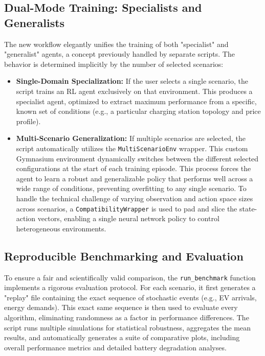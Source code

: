 \subsection{Dual-Mode Training: Specialists and Generalists}
The new workflow elegantly unifies the training of both "specialist" and "generalist" agents, a concept previously handled by separate scripts. The behavior is determined implicitly by the number of selected scenarios:
\begin{itemize}
    \item \textbf{Single-Domain Specialization:} If the user selects a single scenario, the script trains an RL agent exclusively on that environment. This produces a specialist agent, optimized to extract maximum performance from a specific, known set of conditions (e.g., a particular charging station topology and price profile).
    \item \textbf{Multi-Scenario Generalization:} If multiple scenarios are selected, the script automatically utilizes the \texttt{MultiScenarioEnv} wrapper. This custom Gymnasium environment dynamically switches between the different selected configurations at the start of each training episode. This process forces the agent to learn a robust and generalizable policy that performs well across a wide range of conditions, preventing overfitting to any single scenario. To handle the technical challenge of varying observation and action space sizes across scenarios, a \texttt{CompatibilityWrapper} is used to pad and slice the state-action vectors, enabling a single neural network policy to control heterogeneous environments.
\end{itemize}

\subsection{Reproducible Benchmarking and Evaluation}
To ensure a fair and scientifically valid comparison, the \texttt{run\_benchmark} function implements a rigorous evaluation protocol. For each scenario, it first generates a "replay" file containing the exact sequence of stochastic events (e.g., EV arrivals, energy demands). This exact same sequence is then used to evaluate every algorithm, eliminating randomness as a factor in performance differences. The script runs multiple simulations for statistical robustness, aggregates the mean results, and automatically generates a suite of comparative plots, including overall performance metrics and detailed battery degradation analyses.

